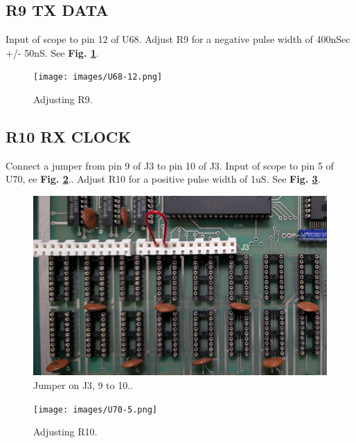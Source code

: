 \subsection{R9 TX DATA}

Input of scope to pin 12 of U68. Adjust R9 for a negative pulse width of 400nSec +/- 50nS. See \textbf{Fig. \ref{fig:R9}}.

\begin{figure}[htbp]
\begin{center}
\texttt{[image: images/U68-12.png]}
\caption{Adjusting R9.}
\label{fig:R9}
\end{center}
\end{figure}

\subsection{R10 RX CLOCK}

Connect a jumper from pin 9 of J3 to pin 10 of J3. Input of scope to pin 5 of U70, ee \textbf{Fig. \ref{fig:jumper}}.. Adjust R10 for a positive pulse width of 1uS. See \textbf{Fig. \ref{fig:R10}}.

\begin{figure}[htbp]
\begin{center}
\includegraphics[width=4.9in]{images/9-10.jpg}
\caption{Jumper on J3, 9 to 10..}
\label{fig:jumper}
\end{center}
\end{figure}

\begin{figure}[htbp]
\begin{center}
\texttt{[image: images/U70-5.png]}
\caption{Adjusting R10.}
\label{fig:R10}
\end{center}
\end{figure}

